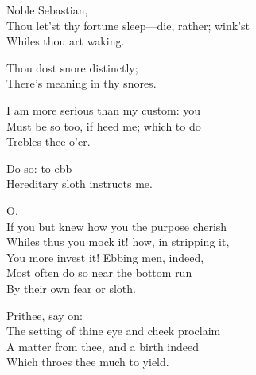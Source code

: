 \begin{verse_speech}[Antonio] 
Noble Sebastian,\\
Thou let'st thy fortune sleep—die, rather; wink'st\\
Whiles thou art waking.
\end{verse_speech}

\begin{verse_speech}[Sebastian] 
Thou dost snore distinctly;\\
There's meaning in thy snores.
\end{verse_speech}

\begin{verse_speech}[Antonio] 
I am more serious than my custom: you\\
Must be so too, if heed me; which to do\\
Trebles thee o'er.
\end{verse_speech}

\begin{verse_speech}[Sebastian] 
Do so: to ebb\\
Hereditary sloth instructs me.
\end{verse_speech}

\begin{verse_speech}[Antonio] 
O,\\
If you but knew how you the purpose cherish\\
Whiles thus you mock it! how, in stripping it,\\
You more invest it! Ebbing men, indeed,\\
Most often do so near the bottom run\\
By their own fear or sloth.
\end{verse_speech}

\begin{verse_speech}[Sebastian] 
Prithee, say on:\\
The setting of thine eye and cheek proclaim\\
A matter from thee, and a birth indeed\\
Which throes thee much to yield.
\end{verse_speech}

